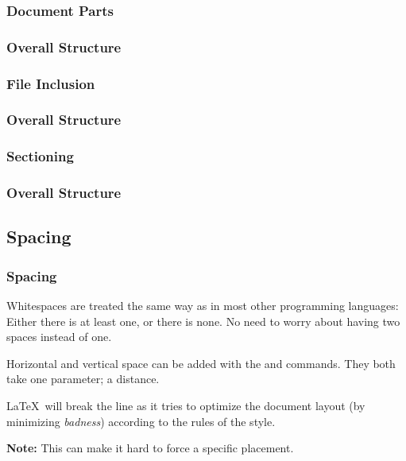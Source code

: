 \subsubsection{Document Parts}
\begin{frame}[fragile]
  \frametitle{Overall Structure }
  \vspace{3mm}
  
\end{frame}

\subsubsection{File Inclusion}
\begin{frame}[fragile]
  \frametitle{Overall Structure }
  \vspace{3mm}
  
\end{frame}

\subsubsection{Sectioning}
\begin{frame}[fragile]
  \frametitle{Overall Structure }
  \vspace{3mm}
  
\end{frame}

\subsection{Spacing}
\begin{frame}[fragile]
  \frametitle{Spacing}
  \vspace{3mm}
  Whitespaces are treated the same way as in most other programming languages: Either there is at least one, or there is none. No need to worry about having two spaces instead of one.
  
  \vspace{5mm}
  Horizontal and vertical space can be added with the  and  commands. They both take one parameter; a distance.
  
  \vspace{5mm}
  \LaTeX\ will break the line as it tries to optimize the document layout (by minimizing \textsl{badness}) according to the rules of the style.
  
  \vspace{5mm}
  \textbf{Note:} This can make it hard to force a specific placement.
\end{frame}

